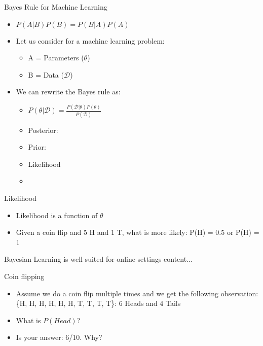 \documentclass{beamer}
\begin{document}
\begin{frame}{Bayes Rule for Machine Learning}
\begin{itemize}


    \item $P(A|B)P(B) = P(B|A)P(A)$
    \item Let us consider for a machine learning problem:
    \begin{itemize}
    	\item A = Parameters ($\theta$)
    	\item B = Data ($\mathcal{D}$)
    \end{itemize}
\item We can rewrite the Bayes rule as:
\begin{itemize}
	\item $P(\theta|\mathcal{D}) = \frac{P(\mathcal{D}|\theta)P(\theta)}{P(\mathcal{D})}$
	\item Posterior: 
	\item Prior:
	\item Likelihood
	\item 
\end{itemize}
\end{itemize}
\end{frame}

\begin{frame}{Likelihood}
\begin{itemize}
	\item Likelihood is a function of $\theta$
	\item Given a coin flip and 5 H and 1 T, what is more likely: P(H) = 0.5 or P(H) = 1
\end{itemize}
\end{frame}

\begin{frame}{Bayesian Learning is well suited for online settings}
content...
\end{frame}

\begin{frame}{Coin flipping}
\begin{itemize}
	\item Assume we do a coin flip multiple times and we get the following observation: \{H, H, H, H, H, H, T, T, T, T\}: 6 Heads and 4 Tails
	\item  What is $P(Head)$?
	\item Is your answer: 6/10. Why?
\end{itemize}

\end{frame}
\end{document}
